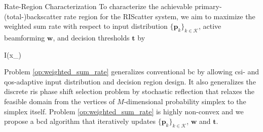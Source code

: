 \documentclass[journal]{IEEEtran}
\begin{document}
\begin{section}{Rate-Region Characterization}
	To characterize the achievable primary-(total-)backscatter rate region for the RIScatter system, we aim to maximize the weighted sum rate with respect to input distribution $\{\boldsymbol{p}_k\}_{k \in \mathcal{K}}$, active beamforming $\boldsymbol{w}$, and decision thresholds $\boldsymbol{t}$ by
	\begin{maxi!}
		{}{I(x_{})}{\label{op:weighted_sum_rate}}{\label{ob:weighted_sum_rate}}
	\end{maxi!}

	Problem \eqref{op:weighted_sum_rate} generalizes conventional \gls{bc} by allowing \gls{csi}- and \gls{qos}-adaptive input distribution and decision region design.
	It also generalizes the discrete \gls{ris} phase shift selection problem by stochastic reflection that relaxes the feasible domain from the vertices of $M$-dimensional probability simplex to the simplex itself.
	Problem \eqref{op:weighted_sum_rate} is highly non-convex and we propose a \gls{bcd} algorithm that iteratively updates $\{\boldsymbol{p}_k\}_{k \in \mathcal{K}}$, $\boldsymbol{w}$ and $\boldsymbol{t}$.


\end{section}
\end{document}
